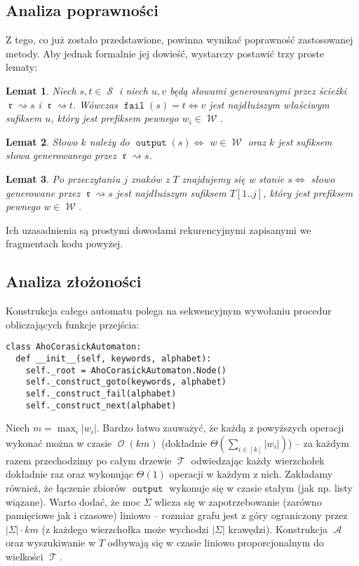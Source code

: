 \documentclass{article}
\newtheorem*{lemma}{Lemat}
\DeclareMathOperator{\rot}{\mathfrak{r}}
\DeclareMathOperator{\W}{\mathcal{W}}
\DeclareMathOperator{\A}{\mathcal{A}}
\DeclareMathOperator{\Otime}{\mathcal{O}}
\DeclareMathOperator{\states}{\mathcal{S}}
\DeclareMathOperator{\trie}{\mathcal{T}}
\DeclareMathOperator{\fail}{\texttt{fail}}
\DeclareMathOperator{\out}{\texttt{output}}
\begin{document}
\subsection{Analiza poprawności}
Z tego, co już zostało przedstawione, powinna wynikać poprawność zastosowanej metody. Aby jednak formalnie jej dowieść, wystarczy postawić trzy proste lematy:

\begin{lemma}
Niech $s,t\in\states$ i niech $u, v$ będą słowami generowanymi przez ścieżki $\rot\rightsquigarrow s$ i $\rot\rightsquigarrow t$. Wówczas $\fail(s) = t \iff v$ jest najdłuższym właściwym sufiksem $u$, który jest prefiksem pewnego $w_i\in\W$.
\end{lemma}

\begin{lemma}
Słowo $k$ należy do $\out(s)\iff$ $w\in\W$ oraz $k$ jest sufiksem słowa generowanego przez $\rot\rightsquigarrow s$.
\end{lemma}

\begin{lemma}
Po przeczytaniu $j$ znaków z $T$ znajdujemy się w stanie $s\iff$ słowo generowane przez $\rot\rightsquigarrow s$ jest najdłuższym sufiksem $T[1..j]$, który jest prefiksem pewnego $w\in\W$.
\end{lemma}

\noindent Ich uzasadnienia są prostymi dowodami rekurencyjnymi zapisanymi we fragmentach kodu powyżej.

\subsection{Analiza złożoności}
Konstrukcja całego automatu polega na sekwencyjnym wywołaniu procedur obliczających funkcje przejścia:

\begin{verbatim}
class AhoCorasickAutomaton:
  def __init__(self, keywords, alphabet):
    self._root = AhoCorasickAutomaton.Node()
    self._construct_goto(keywords, alphabet)
    self._construct_fail(alphabet)
    self._construct_next(alphabet)
\end{verbatim}

Niech $m=\max_i |w_i|$. Bardzo łatwo zauważyć, że każdą z powyższych operacji wykonać można w czasie $\Otime(km)$ (dokładnie $\Theta(\sum_{i\in[k]}|w_i|)$) -- za każdym razem przechodzimy po całym drzewie $\trie$ odwiedzając każdy wierzchołek dokładnie raz oraz wykonując $\Theta(1)$ operacji w każdym z nich. Zakładamy również, że łączenie zbiorów $\out$ wykonuje się w czasie stałym (jak np. listy wiązane). Warto dodać, że moc $\Sigma$ wlicza się w zapotrzebowanie (zarówno pamięciowe jak i czasowe) liniowo -- rozmiar grafu jest z góry ograniczony przez $|\Sigma|\cdot km$ (z każdego wierzchołka może wychodzi $|\Sigma|$ krawędzi). Konstrukcja $\A$ oraz wyszukiwanie w $T$ odbywają się w czasie liniowo proporcjonalnym do wielkości $\trie$.
\end{document}
